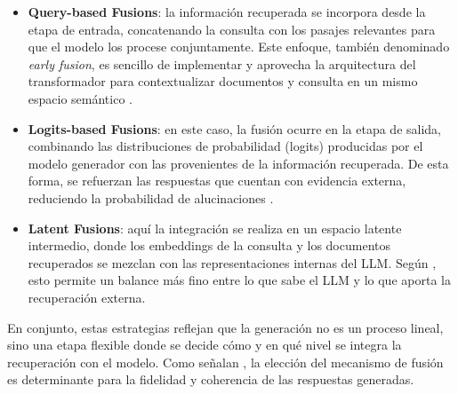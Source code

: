 \begin{itemize}
    \item \textbf{Query-based Fusions}: la información recuperada se incorpora desde la etapa de entrada, concatenando la consulta con los pasajes relevantes para que el modelo los procese conjuntamente. Este enfoque, también denominado \textit{early fusion}, es sencillo de implementar y aprovecha la arquitectura del transformador para contextualizar documentos y consulta en un mismo espacio semántico \parencite{gao2023rag}.  

    \item \textbf{Logits-based Fusions}: en este caso, la fusión ocurre en la etapa de salida, combinando las distribuciones de probabilidad (logits) producidas por el modelo generador con las provenientes de la información recuperada. De esta forma, se refuerzan las respuestas que cuentan con evidencia externa, reduciendo la probabilidad de alucinaciones \parencite{zhai2024llmIR}.  

    \item \textbf{Latent Fusions}: aquí la integración se realiza en un espacio latente intermedio, donde los embeddings de la consulta y los documentos recuperados se mezclan con las representaciones internas del LLM. Según \textcite{hu2024ragrau}, esto permite un balance más fino entre lo que sabe el LLM y lo que aporta la recuperación externa.  
\end{itemize}

En conjunto, estas estrategias reflejan que la generación no es un proceso lineal, sino una etapa flexible donde se decide cómo y en qué nivel se integra la 
recuperación con el modelo. Como señalan \textcite{zhao2024rag}, la elección del mecanismo de fusión es determinante para la fidelidad y coherencia de las respuestas 
generadas.

